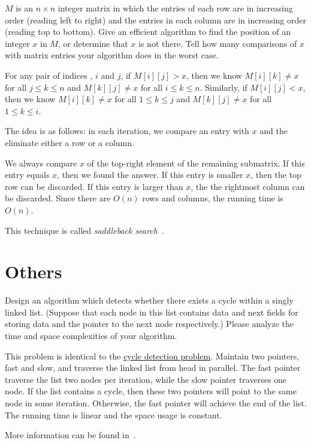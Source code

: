 \begin{Exercise}[origin={NTU CSIE 93}]
$M$ is an $n \times n$ integer matrix in which the entries of each row are in increasing order (reading left to right) and the entries in each column are in increasing order (reading top to bottom). Give an efficient algorithm to find the position of an integer $x$ in $M$, or determine that $x$ is not there. Tell how many comparisons of $x$ with matrix entries your algorithm does in the worst case.
\end{Exercise}
\begin{Answer}
For any pair of indices , $i$ and $j$, if $M[i][j] > x$, then we know $M[i][k] \neq x$ for all $j \leq k \leq n$ and $M[k][j] \neq x$ for all $i \leq k \leq n$. Similarly, if $M[i][j] < x$, then we know $M[i][k] \neq x$ for all $1 \leq k \leq j$ and $M[k][j] \neq x$ for all $1 \leq k \leq i$. 

The idea is as follows: in each iteration, we compare an entry with $x$ and the eliminate either a row or a column.

We always compare $x$ of the top-right element of the remaining submatrix. If this entry equals $x$, then we found the answer. If this entry is smaller $x$, then the top row can be discarded. If this entry is larger than $x$, the the rightmost column can be discarded. Since there are $O(n)$ rows and columns, the running time is $O(n)$. 

\begin{remark}
This technique is called \emph{saddleback search}~\cite{Bird2006}.
\end{remark}
\end{Answer}


\section{Others}
\begin{Exercise}[title={Cycle detection problem},origin={MCU CSIE 95}]
Design an algorithm which detects whether there exists a cycle within a singly linked list. (Suppose that each node in this list contains data and next fields for storing data and the pointer to the next node respectively.) Please analyze the time and space complexities of your algorithm.
\end{Exercise}
\begin{Answer}
This problem is identical to the \href{https://en.wikipedia.org/wiki/Cycle_detection}{cycle detection problem}. Maintain two pointers, fast and slow, and traverse the linked list from head in parallel. The fast pointer traverse the list two nodes per iteration, while the slow pointer traverses one node. If the list contains a cycle, then these two pointers will point to the same node in some iteration. Otherwise, the fast pointer will achieve the end of the list. The running time is linear and the space usage is constant.

\begin{remark}
More information can be found in~\cite{Nesterenko2012}.
\end{remark}
\end{Answer}

